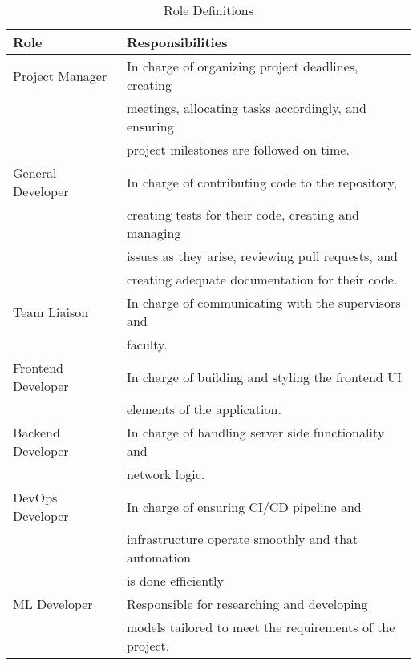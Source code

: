 \documentclass[12pt, titlepage]{article}
\begin{document}
\begin{table}[H]
\caption{Role Definitions}
\label{tab:role-definitions}
\begin{tabular}{|l|l|}
\hline 
\textbf{Role} & \textbf{Responsibilities} \\
\hline 
Project Manager & In charge of organizing project deadlines, creating \\
& meetings, allocating tasks accordingly, and ensuring \\
& project milestones are followed on time.\\
\hline
General Developer & In charge of contributing code to the repository,\\
& creating tests for their code, creating and managing \\
& issues as they arise, reviewing pull requests, and \\
& creating adequate documentation for their code.\\
\hline 
Team Liaison & In charge of communicating with the supervisors and \\
& faculty.\\
\hline 
Frontend Developer & In charge of building and styling the frontend UI \\
& elements of the application. \\
\hline 
Backend Developer & In charge of handling server side functionality and \\
&  network logic.\\
\hline 
DevOps Developer & In charge of ensuring CI/CD pipeline and \\ 
& infrastructure operate smoothly and that automation \\ 
& is done efficiently\\
\hline 
ML Developer & Responsible for researching and developing \\
& models tailored to meet the requirements of the project. \\
\hline
\end{tabular}
\end{table}
\end{document}
